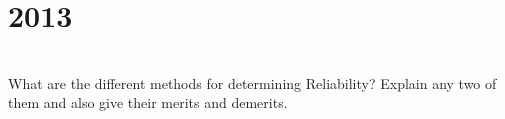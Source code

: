 \section*{2013}
\vspace{-.5cm}
\hrulefill \smallskip\\
 What are the different methods for determining Reliability? Explain any two of them and also give their merits and demerits.
